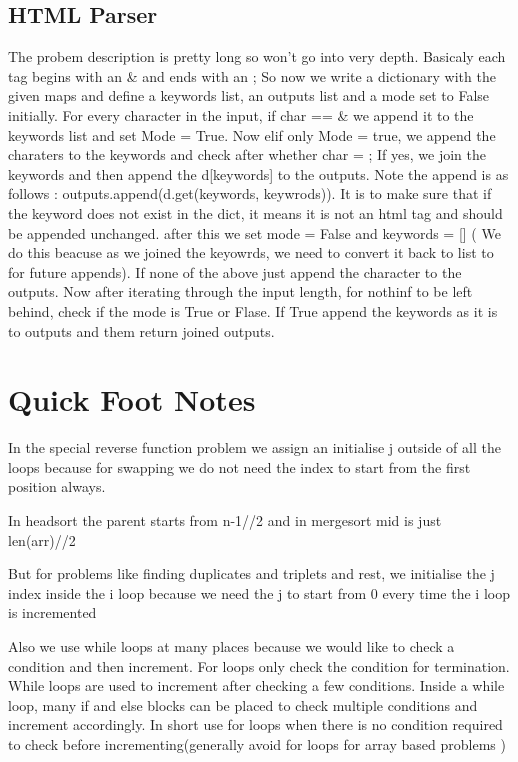 \documentclass{article}
\newcommand{\nd}{\noindent}
\begin{document}
\subsection{HTML Parser}
The probem description is pretty long so won't go into very depth. Basicaly each tag begins with an \& and ends with an ; So now we write a dictionary with the given maps and define a keywords list, an outputs list and a mode set to False initially. For every character in the input, if char == \& we append it to the keywords list and set Mode = True. Now elif only Mode = true, we append the charaters to the keywords and check after whether char = ; If yes, we join the keywords and then append the d[keywords] to the outputs. Note the append is as follows : outputs.append(d.get(keywords, keywrods)). It is to make sure that if the keyword does not exist in the dict, it means it is not an html tag and should be appended unchanged. after this we set mode = False and keywords = [] ( We do this beacuse as we joined the keyowrds, we need to convert it back to list to for future appends). If none of the above just append the character to the outputs. Now after iterating through the input length, for nothinf to be left behind, check if the mode is True or Flase. If True append the keywords as it is to outputs and them return joined outputs.
\newpage 
\section {Quick Foot Notes }
In the special reverse function problem we assign an initialise j outside of all the loops because for swapping we do not need the index to start from the first position always. 

\nd In headsort the parent starts from n-1//2 and in mergesort mid is just len(arr)//2

\nd But for problems like finding duplicates and triplets and rest, we initialise the j index inside the i loop because we need the j to start from 0 every time the i loop is incremented

\nd Also we use while loops at many places because we would like to check a condition and then increment. For loops only check the condition for termination. While loops are used to increment after checking a few conditions. Inside a while loop, many if and else blocks can be placed to check multiple conditions and increment accordingly. In short use for loops when there is no condition required to check before incrementing(generally avoid for loops for array based problems )
\end{document}
